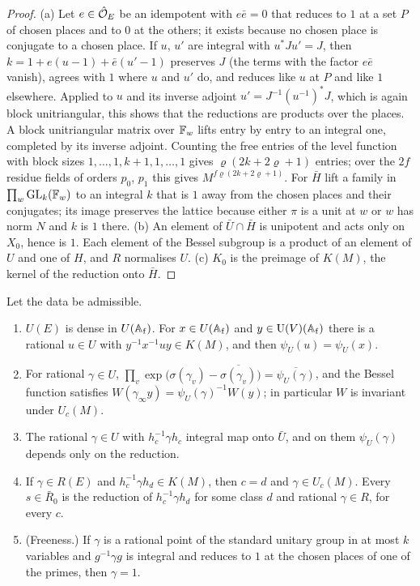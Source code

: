 \begin{proof}
(a) Let $e\in\hat{\mathcal{O}}_E$ be an idempotent with $e\bar e=0$ that reduces to $1$ at a set $P$ of chosen places and to $0$ at the others; it exists because no chosen place is conjugate to a chosen place. If $u$, $u'$ are integral with
$u^*Ju'=J$, then $k=1+e(u-1)+\bar e(u'-1)$ preserves $J$ (the terms with the factor $e\bar e$ vanish), agrees with $1$ where $u$ and $u'$ do, and reduces like $u$ at $P$ and like $1$ elsewhere. Applied to $u$ and its inverse
adjoint $u'=J^{-1}(u^{-1})^*J$, which is again block unitriangular, this shows that the reductions are products over the places. A block unitriangular matrix over $\mathbb{F}_w$ lifts entry by entry to an integral one, completed by its
inverse adjoint. Counting the free entries of the level function with block sizes $1,\dots,1,k+1,1,\dots,1$ gives $\varrho(2k+2\varrho+1)$ entries; over the $2f$ residue fields of orders $p_0$, $p_1$ this gives $M^{f\varrho(2k+2\varrho+1)}$. For $\bar H$
lift a family in $\prod_w\operatorname{GL}_k(\mathbb{F}_w)$ to an integral $k$ that is $1$ away from the chosen places and their conjugates; its image preserves the lattice because either $\pi$ is a unit at $w$ or $w$ has norm $N$ and $k$ is $1$ there.
(b) An element of $\bar U\cap\bar H$ is unipotent and acts only on $X_0$, hence is $1$. Each element of the Bessel subgroup is a product of an element of $U$ and one of $H$, and $R$ normalises $U$. (c) $K_0$ is the
preimage of $K(M)$, the kernel of the reduction onto $\bar H$.
\end{proof}

\begin{lemma}\label{lem:unipotent-character}
Let the data be admissible.
\begin{enumerate}[label=\textup{(\alph*)}]
\item $U(E)$ is dense in $U(\mathbb{A}_{\rm f})$. For $x\in U(\mathbb{A}_{\rm f})$ and $y\in\operatorname{U}(V)(\mathbb{A}_{\rm f})$ there is a rational $u\in U$ with $y^{-1}x^{-1}uy\in K(M)$, and then $\psi_U(u)=\psi_U(x)$.
\item For rational $\gamma\in U$, $\prod_v\exp\bigl(\sigma(\gamma_v)-\overline{\sigma(\gamma_v)}\bigr)=\overline{\psi_U(\gamma)}$, and the Bessel function satisfies $W(\gamma_\infty y)=\psi_U(\gamma)^{-1}W(y)$; in particular $W$ is invariant under $U_c(M)$.
\item The rational $\gamma\in U$ with $h_c^{-1}\gamma h_c$ integral map onto $\bar U$, and on them $\psi_U(\gamma)$ depends only on the reduction.
\item If $\gamma\in R(E)$ and $h_c^{-1}\gamma h_d\in K(M)$, then $c=d$ and $\gamma\in U_c(M)$. Every $s\in\bar R_0$ is the reduction of $h_c^{-1}\gamma h_d$ for some class $d$ and rational $\gamma\in R$, for every $c$.
\item (Freeness.) If $\gamma$ is a rational point of the standard unitary group in at most $k$ variables and $g^{-1}\gamma g$ is integral and reduces to $1$ at the chosen places of one of the primes, then $\gamma=1$.
\end{enumerate}
\end{lemma}

